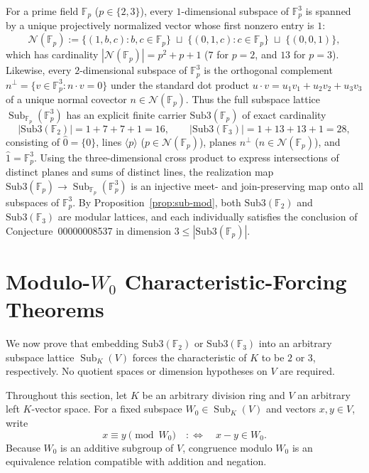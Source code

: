 \documentclass[11pt]{article}
\theoremstyle{definition}
\newcommand{\Sub}{\operatorname{Sub}}
\newcommand{\FF}{\mathbb{F}}
\begin{document}
For a prime field $\FF_p$ ($p \in \{2, 3\}$), every $1$-dimensional subspace of $\FF_p^3$
is spanned by a unique projectively normalized vector whose first nonzero entry is $1$:
\[
  \mathcal{N}(\FF_p)
  := \{(1, b, c) : b, c \in \FF_p\}
     \;\sqcup\; \{(0, 1, c) : c \in \FF_p\}
     \;\sqcup\; \{(0, 0, 1)\},
\]
which has cardinality $|\mathcal{N}(\FF_p)| = p^2 + p + 1$ ($7$ for $p = 2$, and $13$ for
$p = 3$). Likewise, every $2$-dimensional subspace of $\FF_p^3$ is the orthogonal
complement $n^\perp = \{v \in \FF_p^3 : n \cdot v = 0\}$ under the standard dot product
$u \cdot v = u_1 v_1 + u_2 v_2 + u_3 v_3$ of a unique normal covector
$n \in \mathcal{N}(\FF_p)$. Thus the full subspace lattice $\Sub_{\FF_p}(\FF_p^3)$ has an
explicit finite carrier $\mathrm{Sub3}(\FF_p)$ of exact cardinality
\[
  |\mathrm{Sub3}(\FF_2)| = 1 + 7 + 7 + 1 = 16, \qquad
  |\mathrm{Sub3}(\FF_3)| = 1 + 13 + 13 + 1 = 28,
\]
consisting of $\hat{0} = \{0\}$, lines $\langle p \rangle$ ($p \in \mathcal{N}(\FF_p)$),
planes $n^\perp$ ($n \in \mathcal{N}(\FF_p)$), and $\hat{1} = \FF_p^3$. Using the
three-dimensional cross product to express intersections of distinct planes and sums of
distinct lines, the realization map $\mathrm{Sub3}(\FF_p) \to \Sub_{\FF_p}(\FF_p^3)$ is an
injective meet- and join-preserving map onto all subspaces of $\FF_p^3$. By
Proposition~\ref{prop:sub-mod}, both $\mathrm{Sub3}(\FF_2)$ and $\mathrm{Sub3}(\FF_3)$ are
modular lattices, and each individually satisfies the conclusion of
Conjecture~00000008537 in dimension $3 \le |\mathrm{Sub3}(\FF_p)|$.

\section{Modulo-\texorpdfstring{$W_0$}{W0} Characteristic-Forcing Theorems}

We now prove that embedding $\mathrm{Sub3}(\FF_2)$ or $\mathrm{Sub3}(\FF_3)$ into an
arbitrary subspace lattice $\Sub_K(V)$ forces the characteristic of $K$ to be $2$ or $3$,
respectively. No quotient spaces or dimension hypotheses on $V$ are required.

Throughout this section, let $K$ be an arbitrary division ring and $V$ an arbitrary left
$K$-vector space. For a fixed subspace $W_0 \in \Sub_K(V)$ and vectors $x, y \in V$, write
\[
  x \equiv y \pmod{W_0} \quad :\Longleftrightarrow \quad x - y \in W_0.
\]
Because $W_0$ is an additive subgroup of $V$, congruence modulo $W_0$ is an equivalence
relation compatible with addition and negation.
\end{document}
